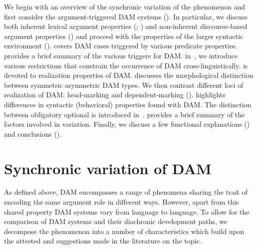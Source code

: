 \documentclass[output=paper]{LSP/langsci}
\begin{document}
We begin with an overview of the synchronic variation of the phenomenon and first consider the argument-triggered DAM systems (). In particular, we discuss both inherent lexical argument properties (; ) and non-inherent discourse-based argument properties () and proceed with the properties of the larger syntactic environment (). 
 covers DAM cases triggered by various predicate properties. 
 provides a brief summary of the various triggers for DAM. 
in~, we introduce various restrictions that constrain the occurrence of DAM cross-linguistically. 
 is devoted to realization properties of DAM. 
 discusses the morphological distinction between symmetric \vs asymmetric DAM types. 
We then contrast different loci of realization of DAM: head-marking and dependent-marking (). 
 highlights differences in syntactic (behavioral) properties found with DAM. 
The distinction between obligatory \vs optional is introduced in~. 
 provides a brief summary of the factors involved in variation. 
Finally, we discuss a few functional explanations () and conclusions ().


\section{Synchronic variation of DAM}
\label{01-wi-sec:2-Synchronic}
As defined above, DAM encompasses a range of phenomena sharing the trait of encoding the same argument role in different ways. 
However, apart from this shared property DAM systems vary from language to language. 
To allow for the comparison of DAM systems and their diachronic development paths, we decompose the phenomenon into a number of characteristics which build upon the attested  and suggestions made in the literature on the topic. 
\end{document}
